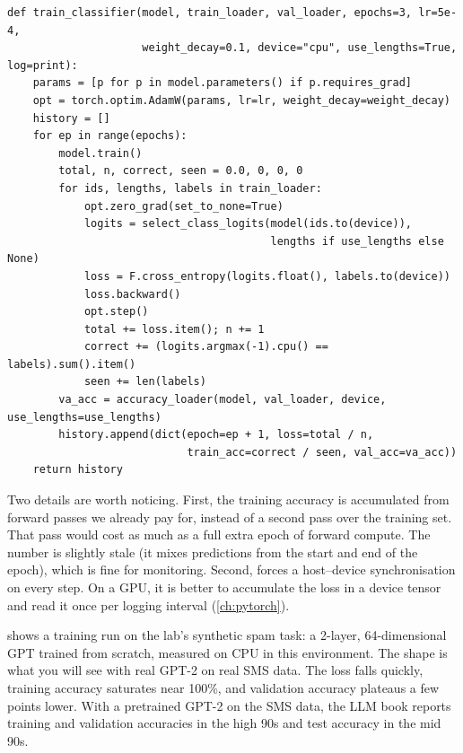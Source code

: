 \begin{lstlisting}[caption={Classification fine-tuning loop (lab reference).},label={lst:classify:train}]
def train_classifier(model, train_loader, val_loader, epochs=3, lr=5e-4,
                     weight_decay=0.1, device="cpu", use_lengths=True, log=print):
    params = [p for p in model.parameters() if p.requires_grad]
    opt = torch.optim.AdamW(params, lr=lr, weight_decay=weight_decay)
    history = []
    for ep in range(epochs):
        model.train()
        total, n, correct, seen = 0.0, 0, 0, 0
        for ids, lengths, labels in train_loader:
            opt.zero_grad(set_to_none=True)
            logits = select_class_logits(model(ids.to(device)),
                                         lengths if use_lengths else None)
            loss = F.cross_entropy(logits.float(), labels.to(device))
            loss.backward()
            opt.step()
            total += loss.item(); n += 1
            correct += (logits.argmax(-1).cpu() == labels).sum().item()
            seen += len(labels)
        va_acc = accuracy_loader(model, val_loader, device, use_lengths=use_lengths)
        history.append(dict(epoch=ep + 1, loss=total / n,
                            train_acc=correct / seen, val_acc=va_acc))
    return history
\end{lstlisting}

Two details are worth noticing. First, the training accuracy is accumulated from
forward passes we already pay for, instead of a second pass over the training set. That
pass would cost as much as a full extra epoch of forward compute. The number is
slightly stale (it mixes predictions from the start and end of the epoch), which is
fine for monitoring. Second,  forces a host--device synchronisation
on every step. On a GPU, it is better to accumulate the loss in a device tensor and
read it once per logging interval (\cref{ch:pytorch}).

 shows a training run on the lab's synthetic spam task: a
2-layer, 64-dimensional GPT trained from scratch, measured on CPU in this environment.
The shape is what you will see with real GPT-2 on real SMS data. The loss falls
quickly, training accuracy saturates near 100\%, and validation accuracy plateaus a few
points lower. With a pretrained GPT-2 on the SMS data, the LLM book reports training
and validation accuracies in the high 90s and test accuracy in the mid 90s.

